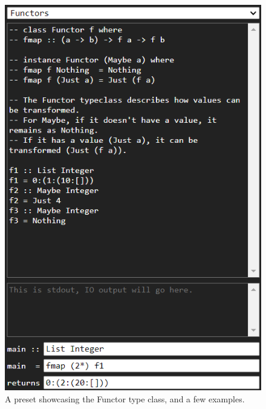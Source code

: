 \begin{figure}
    \centering
    \includegraphics[scale=0.6]{chapters/6-testing/figures/preset.png}
    \caption{A preset showcasing the Functor type class, and a few examples.}
    \label{fig:preset}
\end{figure}
